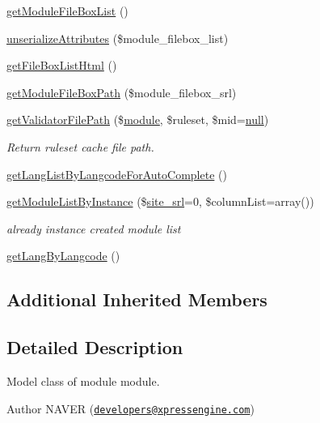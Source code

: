 \begin{DoxyCompactItemize}
\hyperlink{classmoduleModel_a8f3a098b40649594a591e5ea8bd15d96}{get\+Module\+File\+Box\+List} ()
\item 
\hyperlink{classmoduleModel_a60ec88f0d61e7a44887bebba8048a18d}{unserialize\+Attributes} (\$module\+\_\+filebox\+\_\+list)
\item 
\hyperlink{classmoduleModel_acf3405bfe791d8bf7d8e7886b9481923}{get\+File\+Box\+List\+Html} ()
\item 
\hyperlink{classmoduleModel_ac1183d568d6dab443a83c8618e6eb348}{get\+Module\+File\+Box\+Path} (\$module\+\_\+filebox\+\_\+srl)
\item 
\hyperlink{classmoduleModel_a240b4774ddaadc1ded08551120942ca3}{get\+Validator\+File\+Path} (\$\hyperlink{classmodule}{module}, \$ruleset, \$mid=\hyperlink{modernizr_8min_8js_a286f9ec831c5e676eeb493248eab9575}{null})
\begin{DoxyCompactList}\small\item\em Return ruleset cache file path. \end{DoxyCompactList}\item 
\hyperlink{classmoduleModel_aa0e34c0fdc868595793b10b6b4534c74}{get\+Lang\+List\+By\+Langcode\+For\+Auto\+Complete} ()
\item 
\hyperlink{classmoduleModel_a29d890e1acd36f429ff2411533104c8b}{get\+Module\+List\+By\+Instance} (\$\hyperlink{ko_8install_8php_a8b1406b4ad1048041558dce6bfe89004}{site\+\_\+srl}=0, \$column\+List=array())
\begin{DoxyCompactList}\small\item\em already instance created module list \end{DoxyCompactList}\item 
\hyperlink{classmoduleModel_a4ea7187b04b26a98fe6d7fd138817b16}{get\+Lang\+By\+Langcode} ()
\end{DoxyCompactItemize}
\subsection*{Additional Inherited Members}


\subsection{Detailed Description}
Model class of module module. 

\begin{DoxyAuthor}{Author}
N\+A\+V\+ER (\href{mailto:developers@xpressengine.com}{\tt developers@xpressengine.\+com}) 
\end{DoxyAuthor}


